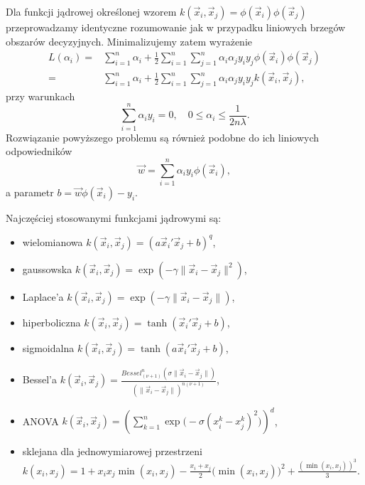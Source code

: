 \documentclass[
]{book}
\providecommand{\tightlist}{%
  \setlength{\itemsep}{0pt}\setlength{\parskip}{0pt}}
\theoremstyle{plain}
\theoremstyle{definition}
\theoremstyle{definition}
\theoremstyle{definition}
\theoremstyle{definition}
\theoremstyle{definition}
\theoremstyle{remark}
\begin{document}
Dla funkcji jądrowej określonej wzorem \(k(\vec{x}_i,\vec{x}_j)=\phi(\vec{x}_i)\phi(\vec{x}_j)\) przeprowadzamy identyczne rozumowanie jak w przypadku liniowych brzegów obszarów decyzyjnych.
Minimalizujemy zatem wyrażenie
\begin{align}
    L(\alpha_i) =& \sum_{i=1}^{n}\alpha_i+\frac{1}{2}\sum_{i=1}^{n}\sum_{j=1}^{n}\alpha_i\alpha_jy_iy_j\phi(\vec{x}_i)\phi(\vec{x}_j)\\
        =&\sum_{i=1}^{n}\alpha_i+\frac{1}{2}\sum_{i=1}^{n}\sum_{j=1}^{n}\alpha_i\alpha_jy_iy_jk(\vec{x}_i,\vec{x}_j),
        \label{eq:strata4}
\end{align}
przy warunkach
\begin{equation}
    \sum_{i=1}^{n}\alpha_iy_i=0,\quad 0\leq \alpha_i\leq \frac{1}{2n\lambda}.
    \label{eq:nier3}
\end{equation}
Rozwiązanie powyższego problemu są również podobne do ich liniowych odpowiedników
\begin{equation}
    \vec{w}=\sum_{i=1}^{n}\alpha_iy_i\phi(\vec{x}_i),
    \label{eq:wagi3}
\end{equation}
a parametr \(b=\vec{w}\phi(\vec{x}_i)-y_i\).

Najczęściej stosowanymi funkcjami jądrowymi są:

\begin{itemize}
\tightlist
\item
  wielomianowa \(k(\vec{x}_i,\vec{x}_j)=(a\vec{x}_i'\vec{x}_j+b)^q\),
\item
  gaussowska \(k(\vec{x}_i,\vec{x}_j)=\exp(-\gamma\|\vec{x}_i-\vec{x}_j\|^2)\),
\item
  Laplace'a \(k(\vec{x}_i,\vec{x}_j)=\exp(-\gamma\|\vec{x}_i-\vec{x}_j\|)\),
\item
  hiperboliczna \(k(\vec{x}_i,\vec{x}_j)=\tanh(\vec{x}_i'\vec{x}_j+b)\),
\item
  sigmoidalna \(k(\vec{x}_i,\vec{x}_j)=\tanh(a\vec{x}_i'\vec{x}_j+b)\),
\item
  Bessel'a \(k(\vec{x}_i,\vec{x}_j)=\frac{Bessel^n_{(\nu+1)}(\sigma\|\vec{x}_i-\vec{x}_j\|)}{(\|\vec{x}_i-\vec{x}_j\|)^{n(\nu+1)}}\),
\item
  ANOVA \(k(\vec{x}_i,\vec{x}_j)=\left(\sum_{k=1}^{n}\exp\big(-\sigma(x^k_i-x^k_j)^2\big)\right)^d\),
\item
  sklejana dla jednowymiarowej przestrzeni \(k(x_i,x_j)=1+x_ix_j\min(x_i,x_j)-\frac{x_i+x_j}{2}\big(\min(x_i,x_j)\big)^2+\frac{(\min(x_i,x_j))^3}{3}\).
\end{itemize}
\end{document}

